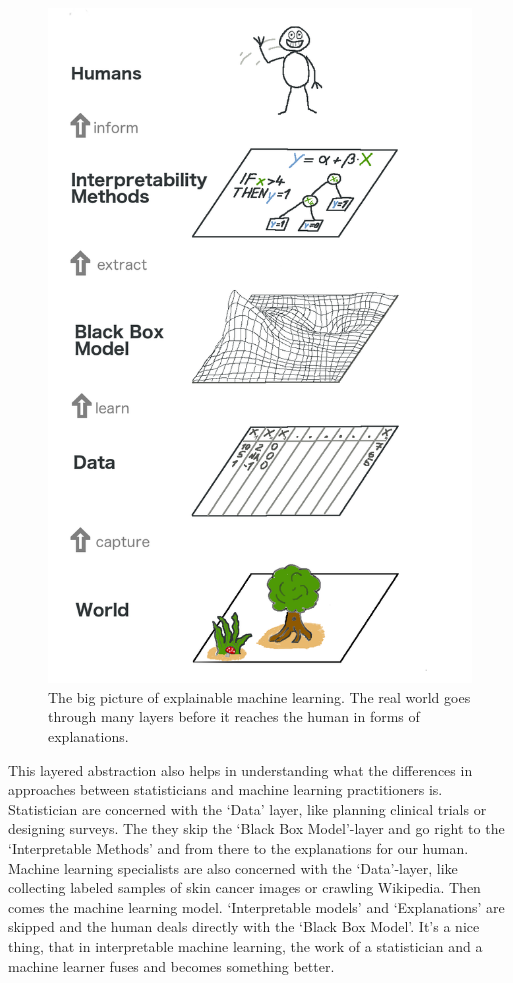 \documentclass[12pt,]{krantz}
\theoremstyle{definition}
\theoremstyle{definition}
\theoremstyle{definition}
\theoremstyle{remark}
\begin{document}
\begin{figure}

{\centering \includegraphics[width=0.8\linewidth]{images/big-picture} 

}

\caption{The big picture of explainable machine learning. The real world goes through many layers before it reaches the human in forms of explanations.}\label{fig:bigpicture}
\end{figure}

This layered abstraction also helps in understanding what the
differences in approaches between statisticians and machine learning
practitioners is. Statistician are concerned with the `Data' layer, like
planning clinical trials or designing surveys. The they skip the `Black
Box Model'-layer and go right to the `Interpretable Methods' and from
there to the explanations for our human. Machine learning specialists
are also concerned with the `Data'-layer, like collecting labeled
samples of skin cancer images or crawling Wikipedia. Then comes the
machine learning model. `Interpretable models' and `Explanations' are
skipped and the human deals directly with the `Black Box Model'. It's a
nice thing, that in interpretable machine learning, the work of a
statistician and a machine learner fuses and becomes something better.
\end{document}
